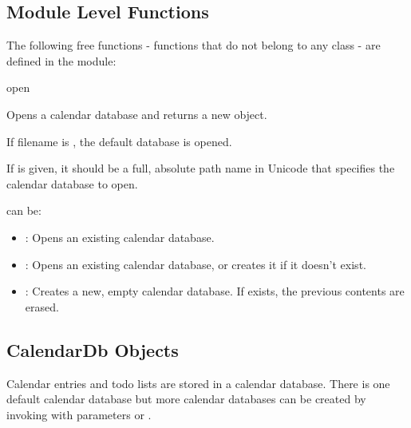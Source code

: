 \subsection{Module Level Functions}
\label{subsec:calendarmodule}
The following free functions - functions that do not belong to any class 
- are defined in the  module:

\begin{funcdesc}{open}{}

Opens a calendar database and returns a new  object.

If filename is , the default database is opened.

If  is given, it should be a full, absolute path name in
Unicode that specifies the calendar database to open. 

 can be:

\begin{itemize}
\item {}: Opens an existing calendar database.
\item {}: Opens an existing calendar database, or creates it if it doesn't exist.
\item {}: Creates a new, empty calendar database. If  exists, the previous contents are erased.
\end{itemize}

\end{funcdesc}

\subsection{CalendarDb Objects}
\label{subsec:calendardb}

Calendar entries and todo lists are stored in a calendar database. There is 
one default calendar database but more calendar databases can be created by 
invoking  with parameters or . 

